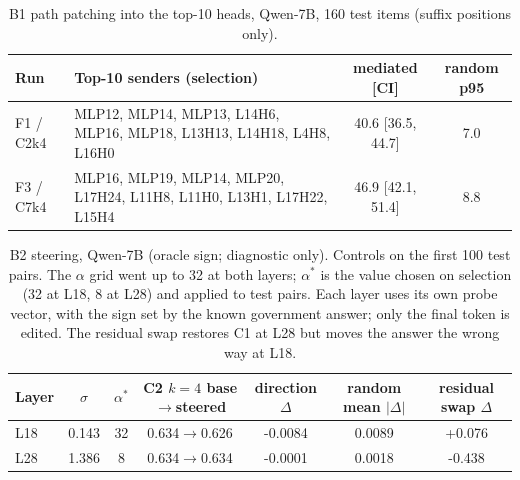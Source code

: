 \begin{table}[!htbp]\centering\scriptsize{}\caption{B0 induction check (random-token sequences; all heads scored).}\end{table}
\begin{table}[!htbp]\centering\scriptsize\begin{tabular}{@{}lp{6.5cm}cc@{}}\toprule Run & Top-10 senders (selection) & mediated [CI] & random p95 \\ \midrule
F1 / C2k4 & MLP12, MLP14, MLP13, L14H6, MLP16, MLP18, L13H13, L14H18, L4H8, L16H0 & 40.6 [36.5, 44.7] & 7.0 \\
F3 / C7k4 & MLP16, MLP19, MLP14, MLP20, L17H24, L11H8, L11H0, L13H1, L17H22, L15H4 & 46.9 [42.1, 51.4] & 8.8 \\
\bottomrule\end{tabular}\caption{B1 path patching into the top-10 heads, Qwen-7B, 160 test items (suffix positions only).}\end{table}
\begin{table}[!htbp]\centering\scriptsize\begin{tabular}{@{}lcccccc@{}}\toprule Layer & $\sigma$ & $\alpha^*$ & C2 $k{=}4$ base$\to$steered & direction $\Delta$ & random mean $|\Delta|$ & residual swap $\Delta$ \\ \midrule
L18 & 0.143 & 32 & 0.634$\to$0.626 & -0.0084 & 0.0089 & +0.076 \\
L28 & 1.386 & 8 & 0.634$\to$0.634 & -0.0001 & 0.0018 & -0.438 \\
\bottomrule\end{tabular}\caption{B2 steering, Qwen-7B (oracle sign; diagnostic only). Controls on the first 100 test pairs. The $\alpha$ grid went up to 32 at both layers; $\alpha^*$ is the value chosen on selection (32 at L18, 8 at L28) and applied to test pairs. Each layer uses its own probe vector, with the sign set by the known government answer; only the final token is edited. The residual swap restores C1 at L28 but moves the answer the wrong way at L18.}\end{table}
